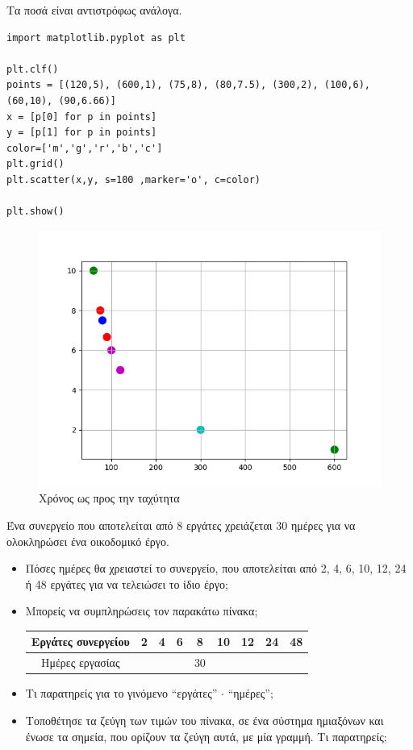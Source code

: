 Τα ποσά είναι αντιστρόφως ανάλογα.

\begin{lstlisting}
import matplotlib.pyplot as plt

plt.clf()
points = [(120,5), (600,1), (75,8), (80,7.5), (300,2), (100,6), (60,10), (90,6.66)]
x = [p[0] for p in points]
y = [p[1] for p in points]
color=['m','g','r','b','c']
plt.grid()
plt.scatter(x,y, s=100 ,marker='o', c=color)

plt.show()
\end{lstlisting}
\begin{figure}
\includegraphics{graph4.png}
\caption{Χρόνος ως προς την ταχύτητα}
\end{figure}
\begin{exercise}
Ένα συνεργείο που αποτελείται από 8 εργάτες χρειάζεται 30 ημέρες για να ολοκληρώσει ένα οικοδομικό έργο. 
\begin{itemize}
	\item  Πόσες ημέρες θα χρειαστεί το συνεργείο,  που αποτελείται από 2, 4, 6, 10, 12, 24 ή 48  εργάτες για να τελειώσει το ίδιο έργο;
	\item Μπορείς να συμπληρώσεις τον παρακάτω  πίνακα;
	\begin{table}
	\begin{tabular}{|c|c|c|c|c|c|c|c|c|}\hline
	Εργάτες συνεργείου &2    & 4& 6& 8& 10& 12& 24& 48\\\hline
	Ημέρες εργασίας       & &    &   & 30 & & & & \\\hline
	\end{tabular}
	\end{table}
\item  Τι παρατηρείς για το γινόμενο ``εργάτες'' $\cdot$ ``ημέρες'';
\item  Τοποθέτησε τα ζεύγη των τιμών του πίνακα, σε ένα σύστημα ημιαξόνων και  ένωσε τα σημεία, που ορίζουν τα ζεύγη αυτά, με μία γραμμή. Τι παρατηρείς;
\end{itemize}
\end{exercise} 
